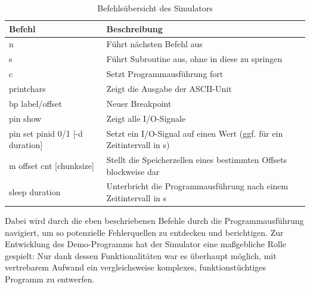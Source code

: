 \begin{table}[h]
\begin{center}
	\begin{tabular}{| l | l |}
	\hline
		\textbf{Befehl} & \textbf{Beschreibung} \\ \hline
		n & F\"uhrt n\"achsten Befehl aus \\ \hline
		s & F\"uhrt Subroutine aus, ohne in diese zu springen\\ \hline
		c & Setzt Programmausf\"uhrung fort \\ \hline
		printchars & Zeigt die Ausgabe der ASCII-Unit\\ \hline
		bp {label/offset} & Neuer Breakpoint\\ \hline
		pin show & Zeigt alle I/O-Signale\\ \hline
		pin set {pinid} {0/1} [-d duration] & Setzt ein I/O-Signal auf einen Wert (ggf. f\"ur ein Zeitintervall in s)\\ \hline
		 m {offset} {cnt} [chunksize] & Stellt die Speicherzellen eines bestimmten Offsets blockweise dar\\ \hline
		 sleep {duration} & Unterbricht die Programmausf\"uhrung nach einem Zeitintervall in s\\ \hline 
	\end{tabular}
\end{center}
\caption{Befehls\"ubersicht des Simulators}
\end{table}

Dabei wird durch die eben beschriebenen Befehle durch die Programmausf\"uhrung navigiert, um so potenzielle Fehlerquellen zu entdecken und berichtigen. Zur Entwicklung des Demo-Programms hat der Simulator eine ma\ss{}gebliche Rolle gespielt: Nur dank dessen Funktionalit\"aten war es \"uberhaupt m\"oglich, mit vertrebarem Aufwand ein vergleichsweise komplexes, funktionst\"uchtiges Programm zu entwerfen.

